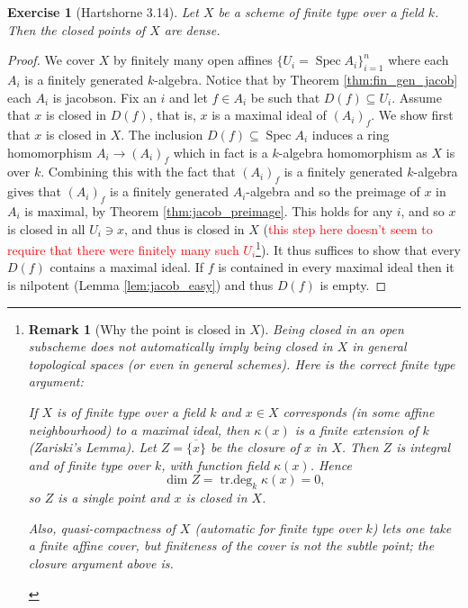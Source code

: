 \documentclass[12pt]{article}
\numberwithin{thm}{subsection}
\numberwithin{defn}{subsection}
\numberwithin{lemma}{subsection}
\numberwithin{example}{subsection}
\numberwithin{notation}{subsection}
\numberwithin{cor}{subsection}
\newtheorem{remark}{Remark}
\numberwithin{remark}{subsection}
\numberwithin{condition}{subsection}
\numberwithin{question}{subsection}
\numberwithin{construction}{subsection}
\newtheorem{exercise}{Exercise}
\numberwithin{construction}{subsection}
\numberwithin{construction}{subsection}
\begin{document}
%
\begin{exercise}[Hartshorne 3.14]
Let $X$ be a scheme of finite type over a field $k$. Then the closed points of $X$ are dense.
\end{exercise}
\begin{proof}
We cover $X$ by finitely many open affines $\lbrace U_i = \operatorname{Spec}A_i\rbrace_{i = 1}^n$ where each $A_i$ is a finitely generated $k$-algebra. Notice that by Theorem \ref{thm:fin_gen_jacob} each $A_i$ is jacobson. Fix an $i$ and let $f \in A_i$ be such that $D(f) \subseteq U_i$. Assume that $x$ is closed in $D(f)$, that is, $x$ is a maximal ideal of $(A_i)_f$. We show first that $x$ is closed in $X$. The inclusion $D(f) \subseteq \operatorname{Spec}A_i$ induces a ring homomorphism $A_i \to (A_i)_f$ which in fact is a $k$-algebra homomorphism as $X$ is over $k$. Combining this with the fact that $(A_i)_f$ is a finitely generated $k$-algebra gives that $(A_i)_f$ is a finitely generated $A_i$-algebra and so the preimage of $x$ in $A_i$ is maximal, by Theorem \ref{thm:jacob_preimage}. This holds for any $i$, and so $x$ is closed in all $U_i \ni x$, and thus is closed in $X$ (\textcolor{red}{this step here doesn't seem to require that there were finitely many such $U_i$}\footnote{\begin{remark}[Why the point is closed in $X$]
Being closed in an open subscheme does \emph{not} automatically imply being closed in $X$ in general topological spaces
(or even in general schemes). Here is the correct finite type argument:

If $X$ is of finite type over a field $k$ and $x\in X$ corresponds (in some affine neighbourhood) to a maximal ideal,
then $\kappa(x)$ is a finite extension of $k$ (Zariski's Lemma).
Let $Z=\overline{\{x\}}$ be the closure of $x$ in $X$. Then $Z$ is integral and of finite type over $k$,
with function field $\kappa(x)$. Hence
\[
\dim Z=\operatorname{tr.deg}_k \kappa(x)=0,
\]
so $Z$ is a single point and $x$ is closed in $X$.

Also, quasi-compactness of $X$ (automatic for finite type over $k$) lets one take a finite affine cover,
but finiteness of the cover is not the subtle point; the closure argument above is.
\end{remark}}). It thus suffices to show that every $D(f)$ contains a maximal ideal. If $f$ is contained in every maximal ideal then it is nilpotent (Lemma \ref{lem:jacob_easy}) and thus $D(f)$ is empty.
\end{proof}

\appendix
\end{document}
